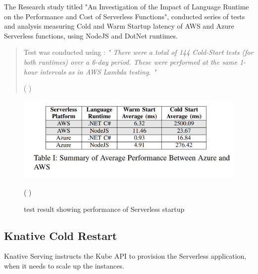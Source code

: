 \documentclass{article}
\begin{document}
\begin{flushleft}
The Research study titled "An Investigation of the Impact of Language Runtime on the Performance and Cost of
Serverless Functions", conducted series of tests and analysis measuring Cold and Warm Startup latency of \gls{AWS} and Azure Serverless functions, using NodeJS and DotNet runtimes. 

\begin{quote}
    Test was conducted using : \newline
     \textit{ " There were a total of 144 Cold-Start tests (for both runtimes) over a 6-day period. These were performed at the same 1-hour intervals as in \gls{AWS} Lambda testing. "} 
     \begin{flushright}
         ( \cite{8605773} )
     \end{flushright} 
\end{quote}

\hfill \break
\begin{figure}[h]
    \centering 
    \includegraphics[width=0.5\linewidth]{images/Table_Ref_Code_Start_UCC-Companion.2018.00050.PNG}
    \caption{test result showing performance of Serverless startup} 
    \begin{flushright}
         ( \cite{8605773} )
    \end{flushright}
\end{figure}
\pagebreak
\subsection{Knative Cold Restart}
Knative Serving instructs the Kube API to provision the Serverless application, when it needs to scale up the instances. 


\end{flushleft}
\end{document}
